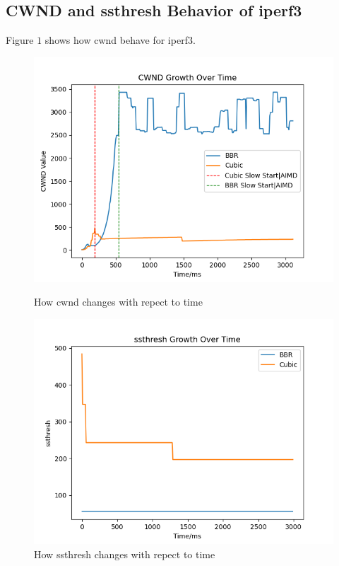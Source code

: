 \documentclass{article}
\begin{document}
\subsection{CWND and ssthresh Behavior of iperf3}
Figure $1$ shows how cwnd behave for iperf3.
\begin{figure}[h]
    \begin{minipage}[b]{0.45\textwidth}
        \centering
        \includegraphics[width=\textwidth]{../figure/cwnd.png}
        \caption{How cwnd changes with repect to time}
        \label{fig:fig1}
    \end{minipage}
    \hfill
    \begin{minipage}[b]{0.45\textwidth}
        \centering
        \includegraphics[width=\textwidth]{../figure/ssthresh.png}
        \caption{How ssthresh changes with repect to time}
        \label{fig:fig2}
    \end{minipage}
\end{figure}
\end{document}
